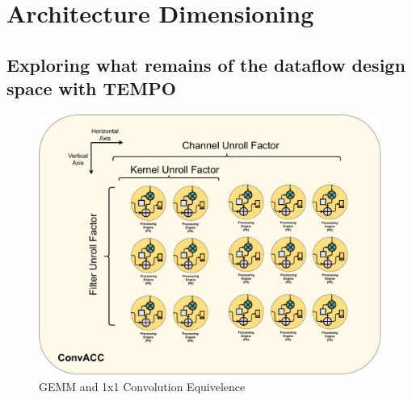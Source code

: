 \chapter{Architecture Dimensioning}
\label{chap:arch_dimensioning}

\section{Exploring what remains of the dataflow design space with TEMPO}
\label{chap:dataflow_dse:exploring}

\begin{figure}[]
    \centering
    \includegraphics[scale=0.4]{fig/axis_mapping.pdf}
    \caption{\ac{GEMM} and 1x1 Convolution Equivelence}
    \label{fig:axis_mapping}
\end{figure}


